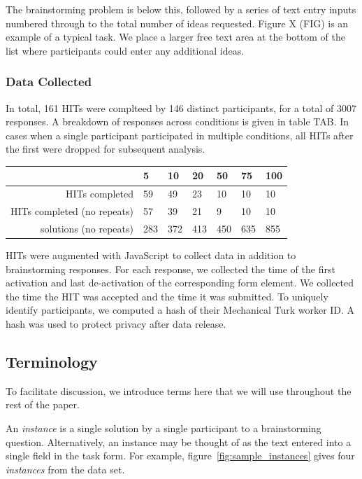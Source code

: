 The brainstorming problem is below this, followed by a series of text entry inputs numbered through to the total number of ideas requested. Figure X (FIG) is an example of a typical task. We place a larger free text area at the bottom of the list where participants could enter any additional ideas.

\subsubsection{Data Collected}

In total, 161 HITs were complteed by 146 distinct participants, for a total of 3007 responses. A breakdown of responses across conditions is given in table TAB. In cases when a single participant participated in multiple conditions, all HITs after the first were dropped for subsequent analysis.

\begin{tabular}[h!]{r | l l l l l l }
& 5 & 10 & 20 & 50 & 75 & 100 \\ \hline \hline
HITs completed & 59 & 49 & 23 & 10 & 10 & 10 \\
HITs completed (no repeats) & 57 & 39 & 21 & 9 & 10 & 10 \\
solutions (no repeats) & 283 & 372 & 413 & 450 & 635 & 855 \\
\end{tabular}

HITs were augmented with JavaScript to collect data in addition to brainstorming responses. For each response, we collected the time of the first activation and last de-activation of the corresponding form element. We collected the time the HIT was accepted and the time it was submitted. To uniquely identify participants, we computed a hash of their Mechanical Turk worker ID. A hash was used to protect privacy after data release.

\subsection{Terminology}

To facilitate discussion, we introduce terms here that we will use throughout the rest of the paper.

An \emph{instance} is a single solution by a single participant to a brainstorming question. Alternatively, an instance may be thought of as the text entered into a single field in the task form. For example, figure~\ref{fig:sample_instances} gives four \emph{instances} from the data set.

